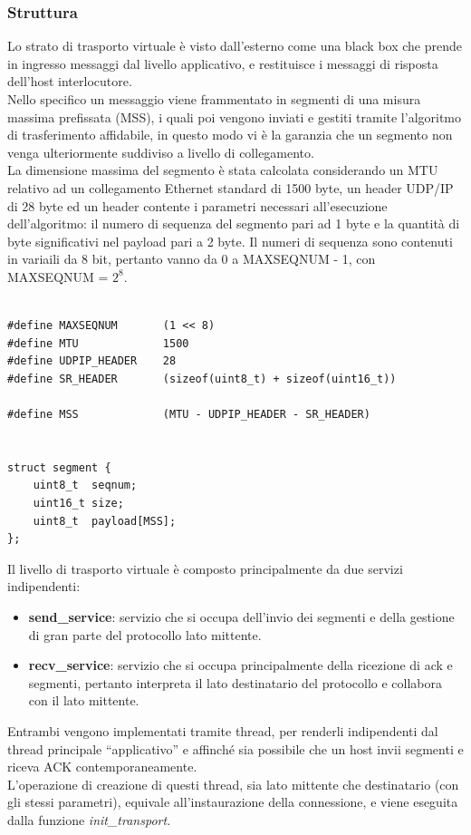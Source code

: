 \subsubsection{Struttura}
Lo strato di trasporto virtuale è visto dall'esterno come una black box che 
prende in ingresso messaggi dal livello applicativo, e restituisce i messaggi
di risposta dell'host interlocutore.\\
Nello specifico un messaggio viene frammentato in segmenti di una misura 
massima prefissata (MSS), i quali poi vengono inviati e gestiti tramite 
l'algoritmo di trasferimento affidabile, in questo modo vi è la garanzia che 
un segmento non venga ulteriormente suddiviso a livello di collegamento.\\
La dimensione massima del segmento è stata calcolata considerando un MTU 
relativo ad un collegamento Ethernet standard di 1500 byte, un header UDP/IP
di 28 byte ed un header contente i parametri necessari all'esecuzione 
dell'algoritmo: il numero di sequenza del segmento pari ad 1 byte e la 
quantità di byte significativi nel payload pari a 2 byte.
Il numeri di sequenza sono contenuti in variaili da 8 bit, pertanto vanno 
da $0$ a MAXSEQNUM - 1, con MAXSEQNUM = $2^8$.

\begin{lstlisting}[title=transport.h]

#define MAXSEQNUM       (1 << 8)
#define MTU             1500
#define UDPIP_HEADER    28
#define SR_HEADER       (sizeof(uint8_t) + sizeof(uint16_t))

#define MSS             (MTU - UDPIP_HEADER - SR_HEADER)


struct segment {
	uint8_t  seqnum;
	uint16_t size;
	uint8_t  payload[MSS];
};
\end{lstlisting}

Il livello di trasporto virtuale è composto principalmente da due servizi 
indipendenti:
\begin{itemize}
\item \textbf{send\_service}: servizio che si occupa dell'invio dei segmenti e
della gestione di gran parte del protocollo lato mittente.
\item \textbf{recv\_service}: servizio che si occupa principalmente della
ricezione di ack e segmenti, pertanto interpreta il lato destinatario del 
protocollo e collabora con il lato mittente.
\end{itemize}
Entrambi vengono implementati tramite thread, per renderli indipendenti dal 
thread principale ``applicativo'' e affinché sia possibile che un host invii 
segmenti e riceva ACK contemporaneamente.\\
L'operazione di creazione di questi thread, sia lato mittente che destinatario
(con gli stessi parametri), equivale all'instaurazione della connessione,
e viene eseguita dalla funzione \emph{init\_transport}.

